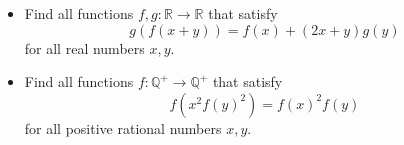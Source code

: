 \documentclass[11pt]{scrartcl}
\begin{document}
\begin{itemize}[label=,itemsep=0.4em,leftmargin=0em]
    \item \begin{btvn}
        Find all functions $f,g: \mathbb{R} \to \mathbb{R}$ that satisfy
        \[g(f(x+y)) = f(x) + (2x + y)g(y)\]
        for all real numbers $x,y$.
    \end{btvn}
    \begin{comment}
        Let $P(x,y)$ be the assertion $g(f(x+y))=f(x)+(2x+y)g(y)$

        Let $x\ne 0$ :
        $P(x,0)$ $\implies$ $g(f(x))=f(x)+2xg(0)$
        $P(0,x)$ $\implies$ $g(f(x))=f(0)+xg(x)$
        Subtracting, we get $g(x)=\frac{f(x)-f(0)}x+2g(0)$ $\forall x\ne 0$

        $P(x,y)$ $\implies$ $g(f(x+y))=f(x)+(2x+y)g(y)$
        $P(x+y,0)$ $\implies$ $g(f(x+y))=f(x+y)+(2x+2y)g(0)$
        Subtracting, we get $f(x+y)=f(x)+(2x+y)g(y)-(2x+2y)g(0)$

        Considering $y\ne 0$ and using previous result, this becomes $f(x+y)=f(x)+(2x+y)\frac{f(y)-f(0)}y+2xg(0)$
        Considering $x\ne 0$ and swapping $x,y$, this becomes $f(x+y)=f(y)+(2y+x)\frac{f(x)-f(0)}x+2yg(0)$

        Considering $x,y\ne 0$ and subtracting, we get $f(x)=x^2(\frac{f(y)-f(0)}{y^2}+\frac{g(0)}y)-g(0)x+f(0)$

        Setting $y=1$ in the above line, we get $f(x)=x^2(f(1)-f(0)+g(0))-g(0)x+f(0)$ $\forall x\ne 0$

        Plugging this in the equality $g(x)=\frac{f(x)-f(0)}x+2g(0)$ $\forall x\ne 0$ we previously got, we get then :
        $g(x)=x(f(1)-f(0)+g(0))+g(0)$ $\forall x\ne 0$

        Plugging this in original equation, we get two possibilities :
        $f(x)=g(x)=0$ $\forall x\ne 0$
        $f(x)=x^2+c$ and $g(x)=x$ $\forall x\ne 0$

        It's then easy to check that we need the same values for $x=0$ and we get the two families of solutions :
        $f(x)=g(x)=0$ $\forall x$
        $f(x)=x^2+c$ and $g(x)=x$ $\forall x$
    \end{comment}

    \item \begin{btvn}
        Find all functions $f: \mathbb{Q}^+ \to \mathbb{Q}^+$ that satisfy
        \[
        f(x^2f(y)^2)=f(x)^2f(y)\tag{1}
        \]
        for all positive rational numbers $x,y$.
    \end{btvn}
\begin{comment}


\end{comment}
\end{itemize}
\end{document}
